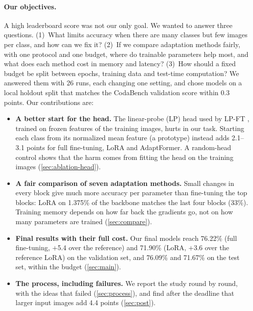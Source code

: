 \paragraph{Our objectives.}
A high leaderboard score was not our only goal.
We wanted to answer three questions.
(1)~What limits accuracy when there are many classes but few images per class, and how can we fix it?
(2)~If we compare adaptation methods fairly, with one protocol and one budget, where do trainable parameters help most, and what does each method cost in memory and latency?
(3)~How should a fixed budget be split between epochs, training data and test-time computation?
We answered them with 26 runs, each changing one setting, and chose models on a local holdout split that matches the CodaBench validation score within 0.3 points.
Our contributions are:
\begin{itemize}[leftmargin=*,itemsep=1pt,topsep=2pt]
    \item \textbf{A better start for the head.} The linear-probe (LP) head used by LP-FT \citep{kumar2022lpft}, trained on frozen features of the training images, hurts in our task. Starting each class from its normalized mean feature (a prototype) instead adds 2.1--3.1 points for full fine-tuning, LoRA and AdaptFormer. A random-head control shows that the harm comes from fitting the head on the training images (\cref{sec:ablation-head}).
    \item \textbf{A fair comparison of seven adaptation methods.} Small changes in every block give much more accuracy per parameter than fine-tuning the top blocks: LoRA on 1.375\% of the backbone matches the last four blocks (33\%). Training memory depends on how far back the gradients go, not on how many parameters are trained (\cref{sec:compare}).
    \item \textbf{Final results with their full cost.} Our final models reach 76.22\% (full fine-tuning, $+$5.4 over the reference) and 71.90\% (LoRA, $+$3.6 over the reference LoRA) on the validation set, and 76.09\% and 71.67\% on the test set, within the budget (\cref{sec:main}).
    \item \textbf{The process, including failures.} We report the study round by round, with the ideas that failed (\cref{sec:process}), and find after the deadline that larger input images add 4.4 points (\cref{sec:post}).
\end{itemize}
